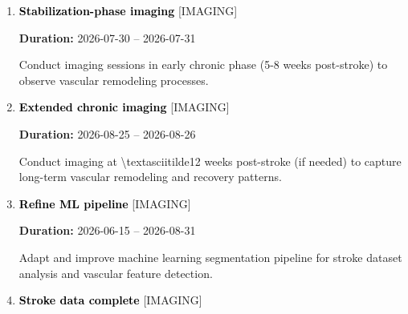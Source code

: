\documentclass[landscape,a4paper]{article}
\begin{document}
\begin{enumerate}[leftmargin=1.5cm, itemsep=1em]
    \item \textcolor{black}{\textbf{\large Stabilization-phase imaging}}
          \hfill \textcolor{black!60}{\small [IMAGING]}
          
          \vspace{0.2em}
          \textcolor{black!70}{\textbf{Duration:} 2026-07-30 -- 2026-07-31}

          \vspace{0.4em}
          \begin{minipage}[t]{0.9\textwidth}
          \textcolor{black!85}{Conduct imaging sessions in early chronic phase (5-8 weeks post-stroke) to observe vascular remodeling processes.}
          \end{minipage}


    \item \textcolor{black}{\textbf{\large Extended chronic imaging}}
          \hfill \textcolor{black!60}{\small [IMAGING]}
          
          \vspace{0.2em}
          \textcolor{black!70}{\textbf{Duration:} 2026-08-25 -- 2026-08-26}

          \vspace{0.4em}
          \begin{minipage}[t]{0.9\textwidth}
          \textcolor{black!85}{Conduct imaging at \textbackslash{}textasciitilde{}12 weeks post-stroke (if needed) to capture long-term vascular remodeling and recovery patterns.}
          \end{minipage}


    \item \textcolor{black}{\textbf{\large Refine ML pipeline}}
          \hfill \textcolor{black!60}{\small [IMAGING]}
          
          \vspace{0.2em}
          \textcolor{black!70}{\textbf{Duration:} 2026-06-15 -- 2026-08-31}

          \vspace{0.4em}
          \begin{minipage}[t]{0.9\textwidth}
          \textcolor{black!85}{Adapt and improve machine learning segmentation pipeline for stroke dataset analysis and vascular feature detection.}
          \end{minipage}


    \item \textcolor{black}{\textbf{\large Stroke data complete}}
          \hfill \textcolor{black!60}{\small [IMAGING]}
          

\end{enumerate}
\end{document}
